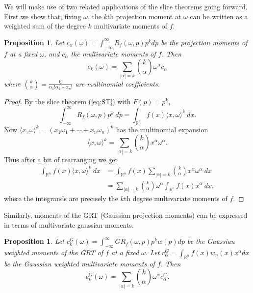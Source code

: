 \documentclass{amsart}
\newtheorem{proposition}[theorem]{Proposition}
\theoremstyle{remark}
\numberwithin{equation}{section}
\newcommand{\RR}{\mathbb{R}}
\begin{document}
We will make use of two related applications of the slice theorems going forward. First we show that, fixing $\omega$, the $k$th projection moment at $\omega$ can be written as a weighted sum of the degree $k$ multivariate moments of $f$. 
\begin{proposition}
    Let $c_\alpha (\omega) = \int_{-\infty}^\infty R_f(\omega, p) p^k dp$ be the projection moments of $f$ at a fixed $\omega$, and $c_\alpha$ the multivariate moments of $f$. Then
    \[
        c_k(\omega) = \sum_{|\alpha| = k}\binom{k}{\alpha} \omega^\alpha c_\alpha
    \]
    where $\binom{k}{\alpha} = \frac{k!}{\alpha_1! \alpha_2! \cdots \alpha_n!}$ are multinomial coefficients.
\end{proposition}
\begin{proof}
By the slice theorem (\ref{eq:ST}) with $F(p) = p^k$,
\[
    \int_{-\infty}^\infty R_f(\omega, p) p^k ~dp 
    = \int_{\RR^n} f(x) \langle x, \omega \rangle^k ~dx.
\]
Now $\langle x, \omega \rangle^k = (x_1 \omega_1 + \cdots + x_n \omega_n)^k$ has the multinomial expansion
\[
    \langle x, \omega \rangle^k = \sum_{|\alpha| = k}\binom{k}{\alpha} x^\alpha\omega^\alpha.
\]
Thus after a bit of rearranging we get
\begin{align*}
    \int_{\RR^n} f(x) \langle x, \omega \rangle^k ~dx
    &= \int_{\RR^n} f(x) \sum_{|\alpha| = k}\binom{k}{\alpha} x^\alpha \omega^\alpha ~dx \\
    &= \sum_{|\alpha| = k}\binom{k}{\alpha} \omega^\alpha \int_{\RR^n} f(x) x^\alpha ~dx,
\end{align*}
where the integrands are precisely the $k$th degree multivariate moments of $f$.
\end{proof}
Similarly, moments of the GRT (Gaussian projection moments) can be expressed in terms of multivariate gaussian moments.
\begin{proposition}
Let $c_k^G(\omega) = \int_{-\infty}^\infty GR_f(\omega, p) p^k w(p) dp$ be the Gaussian weighted moments of the GRT of $f$ at a fixed $\omega$. Let $c^G_\alpha = \int_{\RR^n} f(x) w_n(x) x^\alpha dx$ be the Gaussian weighted multivariate moments of $f$. Then
\[
    c^G_k(\omega) = \sum_{|\alpha| = k}\binom{k}{\alpha} \omega^\alpha c^G_\alpha.
\]
\end{proposition}
\end{document}
